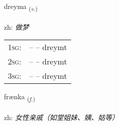 \documentclass[frontgrid, backgrid]{flacards}\usepackage[]{graphicx}\usepackage[]{color}
\begin{document}
\renewcommand{\flhead}{\vskip5pt \fboxsep=0pt {\small\bfseries\footnotesize Sagnorð | 动词}}
\renewcommand{\fcfoot}{\vskip5pt \fboxsep=0pt \hspace{2pt}{\small\bfseries\footnotesize 2K}}

\renewcommand{\blhead}{\vskip5pt {\small\bfseries\footnotesize Sagnorð | 动词 }}
\renewcommand{\bcfoot}{\vskip5pt \hspace{2pt}{\small\bfseries\footnotesize 2K}}


{dreyma \small{\textsubscript{(\textit{v.})}} \\[1ex] %
\textphonetic{[treiːma]} \\
zh: \emph{做梦} \\  [2ex]
\renewcommand*{\arraystretch}{0.8}
\begin{tabular}{p{1cm}l}
\textsc{1sg}: &  --  -- dreymt \\ 
\textsc{2sg}: &  --  -- dreymt \\ 
\textsc{3sg}: &  --  -- dreymt \\ 
\end{tabular}
}

\renewcommand{\flhead}{\vskip5pt \fboxsep=0pt {\small\bfseries\footnotesize Nafnorð | 名词}}
\renewcommand{\fcfoot}{\vskip5pt \fboxsep=0pt \hspace{2pt}{\small\bfseries\footnotesize 2K}}

\renewcommand{\blhead}{\vskip5pt {\small\bfseries\footnotesize Nafnorð | 名词 }}
\renewcommand{\bcfoot}{\vskip5pt \hspace{2pt}{\small\bfseries\footnotesize 2K}}


{frænka \small{\textsubscript{(\textit{f.})}} \\[1ex] %
\textphonetic{[fraiŋ̥ka]} \\
zh: \emph{女性亲戚（如堂姐妹、姨、姑等）} \\  [2ex]
\renewcommand*{\arraystretch}{0.8}
}
\end{document}
